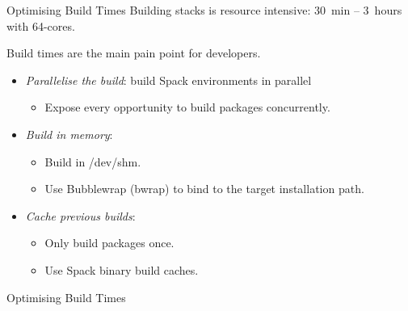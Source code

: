 \documentclass[aspectratio=43]{beamer}
\begin{document}
\begin{frame}[fragile]{Optimising Build Times}
    Building stacks is resource intensive: 30~min -- 3~hours with 64-cores.

    \vspace{10pt}

    Build times are the main pain point for developers.

    \vspace{10pt}

    \begin{itemize}
        \item \emph{Parallelise the build}: build Spack environments in parallel
        \begin{itemize}
            \item Expose every opportunity to build packages concurrently.
        \end{itemize}
        \item \emph{Build in memory}:
        \begin{itemize}
            \item Build in /dev/shm.
            \item Use Bubblewrap (bwrap) to bind to the target installation path.
        \end{itemize}
        \item \emph{Cache previous builds}:
        \begin{itemize}
            \item Only build packages once.
            \item Use Spack binary build caches.
        \end{itemize}
    \end{itemize}
\end{frame}

\begin{frame}[fragile]{Optimising Build Times}
    \begin{center}
        
    \end{center}
\end{frame}


\end{document}
